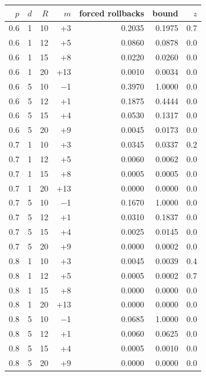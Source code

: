 \begin{tabular}{@{}r r r r r r r@{}}
\toprule
$p$ & $d$ & $R$ & $m$ & forced rollbacks & bound & $z$ \\
\midrule
0.6 & 1 & 10 & +3 & 0.2035 & 0.1975 & 0.7 \\
0.6 & 1 & 12 & +5 & 0.0860 & 0.0878 & 0.0 \\
0.6 & 1 & 15 & +8 & 0.0220 & 0.0260 & 0.0 \\
0.6 & 1 & 20 & +13 & 0.0010 & 0.0034 & 0.0 \\
0.6 & 5 & 10 & $-$1 & 0.3970 & 1.0000 & 0.0 \\
0.6 & 5 & 12 & +1 & 0.1875 & 0.4444 & 0.0 \\
0.6 & 5 & 15 & +4 & 0.0530 & 0.1317 & 0.0 \\
0.6 & 5 & 20 & +9 & 0.0045 & 0.0173 & 0.0 \\
0.7 & 1 & 10 & +3 & 0.0345 & 0.0337 & 0.2 \\
0.7 & 1 & 12 & +5 & 0.0060 & 0.0062 & 0.0 \\
0.7 & 1 & 15 & +8 & 0.0005 & 0.0005 & 0.0 \\
0.7 & 1 & 20 & +13 & 0.0000 & 0.0000 & 0.0 \\
0.7 & 5 & 10 & $-$1 & 0.1670 & 1.0000 & 0.0 \\
0.7 & 5 & 12 & +1 & 0.0310 & 0.1837 & 0.0 \\
0.7 & 5 & 15 & +4 & 0.0025 & 0.0145 & 0.0 \\
0.7 & 5 & 20 & +9 & 0.0000 & 0.0002 & 0.0 \\
0.8 & 1 & 10 & +3 & 0.0045 & 0.0039 & 0.4 \\
0.8 & 1 & 12 & +5 & 0.0005 & 0.0002 & 0.7 \\
0.8 & 1 & 15 & +8 & 0.0000 & 0.0000 & 0.0 \\
0.8 & 1 & 20 & +13 & 0.0000 & 0.0000 & 0.0 \\
0.8 & 5 & 10 & $-$1 & 0.0685 & 1.0000 & 0.0 \\
0.8 & 5 & 12 & +1 & 0.0060 & 0.0625 & 0.0 \\
0.8 & 5 & 15 & +4 & 0.0005 & 0.0010 & 0.0 \\
0.8 & 5 & 20 & +9 & 0.0000 & 0.0000 & 0.0 \\
\bottomrule
\end{tabular}
